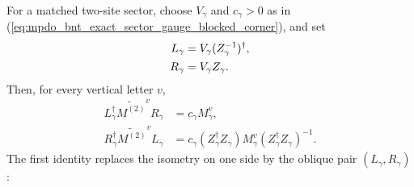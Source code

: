 \begin{lemma}
    \label{thm:mpdo_bnt_exact_sector_identity_oblique_physical_span}
    \leanok
    For a matched two-site sector, choose $V_\gamma$ and
    $c_\gamma>0$ as in
    (\ref{eq:mpdo_bnt_exact_sector_gauge_blocked_corner}), and set
    \begin{align}
        L_\gamma
         & =V_\gamma(Z_\gamma^{-1})^\dagger,
        \label{eq:mpdo_bnt_identity_oblique_maps} \\
        R_\gamma
         & =V_\gamma Z_\gamma.
        \notag
    \end{align}
    Then, for every vertical letter $v$,
    \begin{align}
        L_\gamma^\dagger\widetilde{M^{(2)}}^vR_\gamma
         & =c_\gamma M_\gamma^v,
        \label{eq:mpdo_bnt_identity_oblique_compression} \\
        R_\gamma^\dagger\widetilde{M^{(2)}}^vL_\gamma
         & =c_\gamma
        (Z_\gamma^\dagger Z_\gamma)M_\gamma^v
        (Z_\gamma^\dagger Z_\gamma)^{-1}.
        \label{eq:mpdo_bnt_identity_oblique_opposite}
    \end{align}
    The first identity replaces the isometry on one side by the oblique
    pair $(L_\gamma,R_\gamma)$:
    \begin{center}
        \tenkzkernel
        \begin{tenkz}[rows={wire}, cols=3, west=open, east=open]

\end{tenkz}
\end{center}
\end{lemma}
